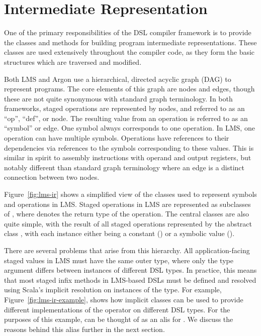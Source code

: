 \section{Intermediate Representation}
One of the primary responsibilities of the DSL compiler framework is to provide the classes and methods for building program intermediate
representations. These classes are used extensively throughout the compiler
code, as they form the basic structures which are traversed and modified.

Both LMS and Argon use a hierarchical, directed acyclic graph (DAG) to represent programs. The core elements of this graph are nodes and edges,
though these are not quite synonymous with standard graph terminology.
In both frameworks, staged operations are represented by nodes, and referred to as an ``op'', ``def'', or node. The resulting value from an operation
is referred to as an ``symbol'' or edge. One symbol always corresponds to
one operation. In LMS, one operation can have multiple symbols.
Operations have references to their dependencies via
references to the symbols corresponding to these
values. This is similar in spirit to
assembly instructions with operand and output registers, but notably different
than standard graph terminology where an edge is a distinct connection between two nodes.

Figure~\ref{fig:lms-ir} shows a simplified view of the classes
used to represent symbols and operations in LMS.
Staged operations in LMS are represented as subclasses of , where
 denotes the return type of the operation.
The central classes are also quite simple, with the result of all staged
operations represented by the abstract class ,
with each instance either being a constant ()
or a symbolic value ().

There are several problems that arise from this hierarchy.
All application-facing staged values in LMS must have the same outer
 type, where only the type argument  differs between
instances of different DSL types. In practice, this means that most staged
infix methods in LMS-based DSLs must be defined and resolved using Scala's
implicit resolution on instances of the  type. For example,
Figure~\ref{fig:lms-ir-example}, shows how implicit classes can be used to
provide different implementations of the \stt{+} operator on different
DSL types. For the purposes of this example,
 can be thought of as an alis for . We discuss the
reasons behind this alias further in the next section.

